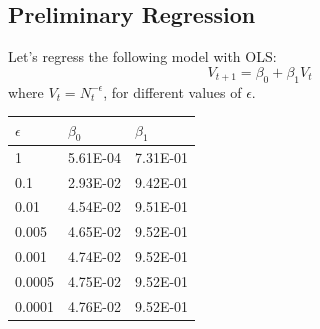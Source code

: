     \subsection{Preliminary Regression}
    Let's regress the following model with OLS:
    \begin{equation}
        V_{t+1} = \beta_0 + \beta_1 V_t
    \end{equation}
    where $V_t=N_t^{-\epsilon}$, for different values of $\epsilon$.
    \begin{table}[h!]
        \centering
        \begin{tabular}{lll}
            $\epsilon$ & $\beta_0$ & $\beta_1$ \\ \hline
            1      & 5.61E-04 & 7.31E-01 \\
            0.1    & 2.93E-02 & 9.42E-01 \\
            0.01   & 4.54E-02 & 9.51E-01 \\
            0.005  & 4.65E-02 & 9.52E-01 \\
            0.001  & 4.74E-02 & 9.52E-01 \\
            0.0005 & 4.75E-02 & 9.52E-01 \\
            0.0001 & 4.76E-02 & 9.52E-01
        \end{tabular}
    \end{table}
